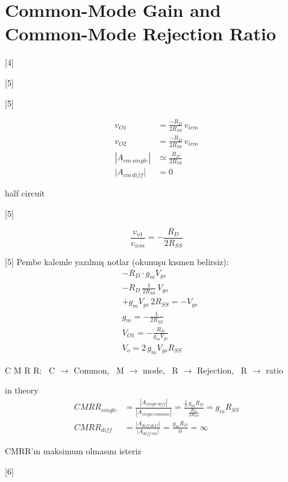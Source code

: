 \documentclass[11pt,a4paper]{article}
\begin{document}
\section{Common-Mode Gain and Common-Mode Rejection Ratio}
[4]

[5]

[5]

\begin{align*}
v_{O1} &= \frac{-R_D}{2R_{SS}}\,v_{icm} \\
v_{O2} &= \frac{-R_D}{2R_{SS}}\,v_{icm} \\
|A_{cm\,single}| &\simeq \frac{R_D}{2R_{SS}} \\
|A_{cm\,diff}| &= 0
\end{align*}

half circuit

[5]

\[ \frac{v_{o1}}{v_{icm}} = -\frac{R_D}{2R_{SS}} \]

[5]
Pembe kalemle yazılmış notlar (okunuşu kısmen belirsiz):
\begin{align*}
& -R_D \cdot g_m V_{gs} \\
& -R_D\,\frac{1}{2R_{SS}}\,V_{gs} \\
& +g_m V_{gs}\,2R_{SS} = -V_{gs} \\
& g_m = -\frac{1}{2R_{SS}} \\
& V_{O1} = -\frac{R_D}{g_m V_{gs}} \\
& V_o = 2\,g_m V_{gs} R_{SS}
\end{align*}

C M R R: \ C $\rightarrow$ Common, \ M $\rightarrow$ mode, \ R $\rightarrow$ Rejection, \ R $\rightarrow$ ratio

in theory
\begin{align*}
CMRR_{single} &= \frac{|A_{single\,diff}|}{|A_{single\,common}|} = \frac{\frac{1}{2}\,g_m R_D}{\frac{R_D}{2R_{SS}}} = g_m R_{SS} \\[2mm]
CMRR_{diff} &= \frac{|A_{diff\,diff}|}{|A_{diff\,cm}|} = \frac{g_m R_D}{0} = \infty
\end{align*}

CMRR'ın maksimum olmasını isteriz

[6]
\end{document}
